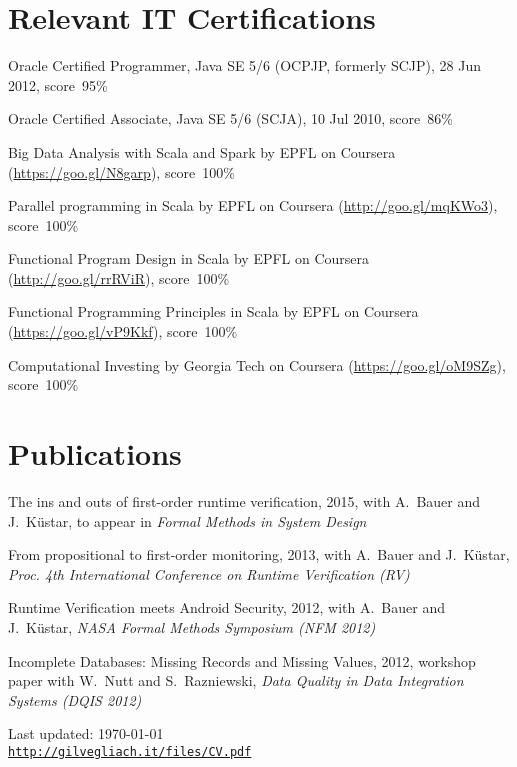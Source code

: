\documentclass[letterpaper]{article}
\def\footerlink{http://gilvegliach.it/files/CV.pdf}
\newenvironment{no-indent-itemize}{
  \begin{list}{}{
    \setlength{\leftmargin}{0em}
  }
}{
  \end{list}
}
\begin{document}
\section*{Relevant IT Certifications}
\begin{no-indent-itemize}
  \item Oracle Certified Programmer, Java SE 5/6 (OCPJP, formerly SCJP), 28 Jun 2012, score~95\%
  \item Oracle Certified Associate, Java SE 5/6 (SCJA), 10 Jul 2010, score~86\%
  \item Big Data Analysis with Scala and Spark by EPFL on Coursera 
        (\href{https://goo.gl/N8garp}{https://goo.gl/N8garp}), score~100\%
  \item Parallel programming in Scala by EPFL on Coursera 
        (\href{http://goo.gl/mqKWo3}{http://goo.gl/mqKWo3}), score~100\%
  \item Functional Program Design in Scala by EPFL on Coursera 
        (\href{https://goo.gl/vP9Kkf}{http://goo.gl/rrRViR}), score~100\%
  \item Functional Programming Principles in Scala by EPFL on Coursera 
        (\href{https://goo.gl/vP9Kkf}{https://goo.gl/vP9Kkf}), score~100\%
   \item Computational Investing by Georgia Tech on Coursera 
        (\href{https://goo.gl/oM9SZg}{https://goo.gl/oM9SZg}), score~100\%
\end{no-indent-itemize}

\section*{Publications}
\begin{no-indent-itemize}
  \item The ins and outs of first-order runtime verification, 2015, with A.~Bauer and J.~K\"{u}star, 
        to appear in {\it Formal Methods in System Design}
  \item From propositional to first-order monitoring, 2013, with A.~Bauer and J.~K\"{u}star, 
        {\it Proc. 4th International Conference on Runtime Verification (RV)}
  \item Runtime Verification meets Android Security, 2012, with A.~Bauer and J.~K\"{u}star, 
        {\it NASA Formal Methods Symposium (NFM 2012)}
  \item Incomplete Databases: Missing Records and Missing Values, 2012, workshop paper with 
        W.~Nutt and S.~Razniewski, {\it Data Quality in Data Integration Systems (DQIS 2012)}
\end{no-indent-itemize}

\bigskip
\begin{center}
  \begin{footnotesize}
    Last updated: \today \\
    \href{\footerlink}{\texttt{\footerlink}}
  \end{footnotesize}
\end{center}
\end{document}
